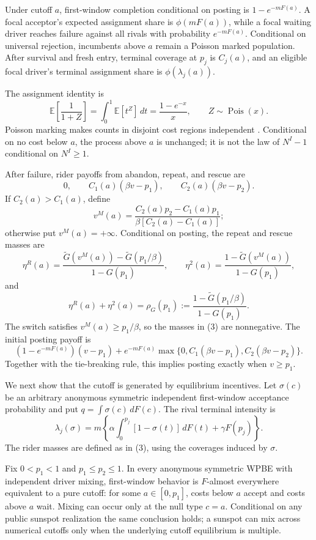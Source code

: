 \documentclass[mnsc,blindrev]{informs3}
\newcommand{\E}{\mathbb E}
\newcommand{\ph}{\phi}
\begin{document}
\begin{lemma}
\label{lem:poisson}
Under cutoff \(a\), first-window completion conditional on posting is
\(1-e^{-mF(a)}\).  A focal acceptor's expected assignment share is
\(\ph(mF(a))\), while a focal waiting driver reaches failure against all rivals
with probability \(e^{-mF(a)}\).  Conditional on universal rejection,
incumbents above \(a\) remain a Poisson marked population.  After survival and
fresh entry, terminal coverage at \(p_j\) is \(C_j(a)\), and an eligible focal
driver's terminal assignment share is \(\ph(\lambda_j(a))\).
\end{lemma}

The assignment identity is
\[
 \E\left[\frac1{1+Z}\right]=\int_0^1\E[t^Z]\,dt
 =\frac{1-e^{-x}}x,\qquad Z\sim\operatorname{Pois}(x).
\]
Poisson marking makes counts in disjoint cost regions independent
\citep{Myerson1998}.  Conditional on no cost below \(a\), the process above
\(a\) is unchanged; it is not the law of \(N^I-1\) conditional on
\(N^I\ge1\).

After failure, rider payoffs from abandon, repeat, and rescue are
\[
 0,\qquad C_1(a)(\beta v-p_1),\qquad C_2(a)(\beta v-p_2).
\]
If \(C_2(a)>C_1(a)\), define
\[
 v^M(a)=\frac{C_2(a)p_2-C_1(a)p_1}
 {\beta[C_2(a)-C_1(a)]};
\]
otherwise put \(v^M(a)=+\infty\).  Conditional on posting, the repeat and
rescue masses are
\[
 \eta^R(a)=
 \frac{\widetilde G(v^M(a))-\widetilde G(p_1/\beta)}
 {1-G(p_1)},\qquad
 \eta^2(a)=\frac{1-\widetilde G(v^M(a))}{1-G(p_1)},       \tag{3}
\]
and
\[
 \eta^R(a)+\eta^2(a)=
 \rho_G(p_1):=
 \frac{1-\widetilde G(p_1/\beta)}{1-G(p_1)}.              \tag{4}
\]
The switch satisfies \(v^M(a)\ge p_1/\beta\), so the masses in (3) are
nonnegative.  The initial posting payoff is
\[
 (1-e^{-mF(a)})(v-p_1)+e^{-mF(a)}
 \max\{0,C_1(\beta v-p_1),C_2(\beta v-p_2)\}.
\]
Together with the tie-breaking rule, this implies posting exactly when
\(v\ge p_1\).

We next show that the cutoff is generated by equilibrium incentives.  Let
\(\sigma(c)\) be an arbitrary anonymous symmetric independent first-window
acceptance probability and put \(q=\int\sigma(c)\,dF(c)\).  The rival terminal
intensity is
\[
 \lambda_j(\sigma)=m\left\{\alpha\int_0^{p_j}
 [1-\sigma(t)]\,dF(t)+\gamma F(p_j)\right\}.              \tag{5}
\]
The rider masses are defined as in (3), using the coverages induced by
\(\sigma\).

\begin{theorem}
\label{thm:endogenouscutoff}
Fix \(0<p_1<1\) and \(p_1\le p_2\le1\).  In every anonymous symmetric WPBE with independent
driver mixing, first-window behavior is \(F\)-almost everywhere equivalent to
a pure cutoff: for some \(a\in[0,p_1]\), costs below \(a\) accept and costs
above \(a\) wait.  Mixing can occur only at the null type \(c=a\).
Conditional on any public sunspot realization the same conclusion holds; a
sunspot can mix across numerical cutoffs only when the underlying cutoff
equilibrium is multiple.
\end{theorem}
\end{document}
